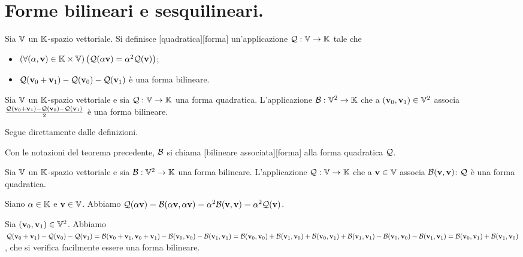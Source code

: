 \section{Forme bilineari e sesquilineari.}
\label{GeometriaLineare_FormeBilineariESesquilineari}
\begin{Definition}
	Sia $\mathbb{V}$ un $\mathbb{K}$-spazio vettoriale. Si definisce [quadratica][forma] un'applicazione $\mathcal{Q}: \mathbb{V} \rightarrow \mathbb{K}$ tale che
	\begin{itemize}
		\item $\left ( \forall (\alpha,\mathbf{v}) \in \mathbb{K} \times \mathbb{V} \right ) \left ( \mathcal{Q}(\alpha \mathbf{v}) = \alpha^2 \mathcal{Q}(\mathbf{v}) \right )$;
		\item $\mathcal{Q}(\mathbf{v}_0 + \mathbf{v}_1) - \mathcal{Q}(\mathbf{v}_0) - \mathcal{Q}(\mathbf{v}_1)$ \`e una forma bilineare.
	\end{itemize}
\end{Definition}
\begin{Theorem}
	Sia $\mathbb{V}$ un $\mathbb{K}$-spazio vettoriale e sia $\mathcal{Q}: \mathbb{V} \rightarrow \mathbb{K}$ una forma quadratica. L'applicazione $\mathcal{B}: \mathbb{V}^2 \rightarrow \mathbb{K}$ che a $(\mathbf{v}_0,\mathbf{v}_1) \in \mathbb{V}^2$ associa $\frac{\mathcal{Q}(\mathbf{v}_0 + \mathbf{v}_1) - \mathcal{Q}(\mathbf{v}_0) - \mathcal{Q}(\mathbf{v}_1)}{2}$ \`e una forma bilineare.
\end{Theorem}
\Proof Segue direttamente dalle definizioni. \EndProof
\begin{Definition}
	Con le notazioni del teorema precedente, $\mathcal{B}$ si chiama [bilineare associata][forma] alla forma quadratica $\mathcal{Q}$.
\end{Definition}
\begin{Theorem}
	Sia $\mathbb{V}$ un $\mathbb{K}$-spazio vettoriale e sia $\mathcal{B}: \mathbb{V}^2 \rightarrow \mathbb{K}$ una forma bilineare. L'applicazione $\mathcal{Q}: \mathbb{V} \rightarrow \mathbb{K}$ che a $\mathbf{v} \in \mathbb{V}$ associa $\mathcal{B}(\mathbf{v},\mathbf{v})$: $\mathcal{Q}$ \`e una forma quadratica.
\end{Theorem}
\Proof Siano $\alpha \in \mathbb{K}$ e $\mathbf{v} \in \mathbb{V}$. Abbiamo $\mathcal{Q}(\alpha \mathbf{v}) = \mathcal{B}(\alpha \mathbf{v}, \alpha \mathbf{v}) = \alpha^2 \mathcal{B}(\mathbf{v},\mathbf{v}) = \alpha^2\mathcal{Q}(\mathbf{v})$.
\par Sia $(\mathbf{v}_0,\mathbf{v}_1) \in \mathbb{V}^2$. Abbiamo $\mathcal{Q}(\mathbf{v}_0 + \mathbf{v}_1) - \mathcal{Q}(\mathbf{v}_0) - \mathcal{Q}(\mathbf{v}_1) = \mathcal{B}(\mathbf{v}_0 + \mathbf{v}_1, \mathbf{v}_0 + \mathbf{v}_1) - \mathcal{B}(\mathbf{v}_0, \mathbf{v}_0) - \mathcal{B}(\mathbf{v}_1, \mathbf{v}_1) = \mathcal{B}(\mathbf{v}_0,\mathbf{v}_0) + \mathcal{B}(\mathbf{v}_1,\mathbf{v}_0) + \mathcal{B}(\mathbf{v}_0,\mathbf{v}_1) + \mathcal{B}(\mathbf{v}_1, \mathbf{v}_1) - \mathcal{B}(\mathbf{v}_0,\mathbf{v}_0) - \mathcal{B}(\mathbf{v}_1,\mathbf{v}_1) = \mathcal{B}(\mathbf{v}_0,\mathbf{v}_1) + \mathcal{B}(\mathbf{v}_1,\mathbf{v}_0)$, che si verifica facilmente essere una forma bilineare.
